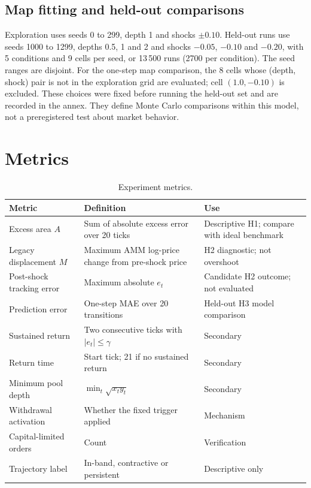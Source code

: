 \subsection{Map fitting and held-out comparisons}

Exploration uses seeds 0 to 299, depth 1 and shocks $\pm0.10$. Held-out runs use seeds 1000 to 1299, depths 0.5, 1 and 2 and shocks $-0.05$, $-0.10$ and $-0.20$, with 5 conditions and 9 cells per seed, or 13\,500 runs (2700 per condition). The seed ranges are disjoint. For the one-step map comparison, the 8 cells whose (depth, shock) pair is not in the exploration grid are evaluated; cell $(1.0,-0.10)$ is excluded. These choices were fixed before running the held-out set and are recorded in the annex. They define Monte Carlo comparisons within this model, not a preregistered test about market behavior.

\section{Metrics}

\begin{table}[htbp]
\centering
\caption{Experiment metrics.}
\label{tab:metricas}
\small
\begin{tabularx}{\textwidth}{@{}l >{\raggedright\arraybackslash}X l@{}}
\toprule
Metric & Definition & Use \\
\midrule
Excess area $A$ & Sum of absolute excess error over 20 ticks & Descriptive H1; compare with ideal benchmark \\
Legacy displacement $M$ & Maximum AMM log-price change from pre-shock price & H2 diagnostic; not overshoot \\
Post-shock tracking error & Maximum absolute $e_t$ & Candidate H2 outcome; not evaluated \\
Prediction error & One-step MAE over 20 transitions & Held-out H3 model comparison \\
Sustained return & Two consecutive ticks with $|e_t|\le\gamma$ & Secondary \\
Return time & Start tick; 21 if no sustained return & Secondary \\
Minimum pool depth & $\min_t\sqrt{x_ty_t}$ & Secondary \\
Withdrawal activation & Whether the fixed trigger applied & Mechanism \\
Capital-limited orders & Count & Verification \\
Trajectory label & In-band, contractive or persistent & Descriptive only \\
\bottomrule
\end{tabularx}
\end{table}

